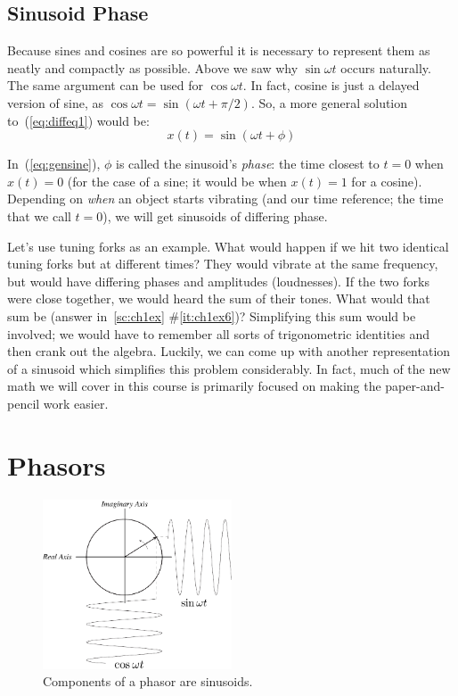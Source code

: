 \subsection*{Sinusoid Phase}

Because sines and cosines are so powerful it is necessary to represent them as neatly and compactly as possible. Above we saw why $\sin\omega t$ occurs naturally. The same argument can be used for $\cos\omega t$.  In fact, cosine is
just a delayed version of sine, as $\cos\omega t = \sin(\omega t +
\pi/2)$.  So, a more general solution to~(\ref{eq:diffeq1}) would
be:
\begin{equation}
x(t) = \sin(\omega t + \phi) \label{eq:gensine}
\end{equation}

In~(\ref{eq:gensine}), $\phi$ is called the sinusoid's \emph{phase}:
the time closest to $t=0$ when $x(t)=0$ (for the case of a sine; it
would be when $x(t)=1$ for a cosine). Depending on \emph{when} an object
starts vibrating (and our time reference; the time that we call $t=0$),
we will get sinusoids of differing phase.

Let's use tuning forks as an example. 
What would happen if we hit two identical tuning forks but at
different times?  They would vibrate at the same frequency, but would
have differing phases and amplitudes (loudnesses).  If the two forks
were close together, we would heard the sum of their tones. What would
that sum be (answer in~\ref{sc:ch1ex} \#\ref{it:ch1ex6})? Simplifying
this sum would be involved; we would have to remember all sorts of
trigonometric identities and then crank out the algebra. Luckily, we
can come up with another representation of a sinusoid which simplifies
this problem considerably. In fact, much of the new math we will cover
in this course is primarily focused on making the paper-and-pencil
work easier.

\section{Phasors}

\begin{figure}
\centerline{\includegraphics[width=0.5\textwidth]{ch-physical/phasor-components}}
\caption{Components of a phasor are sinusoids.\label{fg:phasor-components}}
\end{figure}

